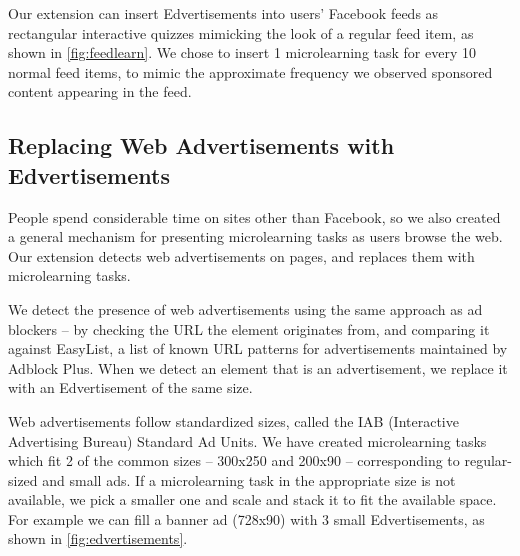 \documentclass{sigchi}
\begin{document}
Our extension can insert Edvertisements into users' Facebook feeds as rectangular interactive quizzes mimicking the look of a regular feed item, as shown in \autoref{fig:feedlearn}. We chose to insert 1 microlearning task for every 10 normal feed items, to mimic the approximate frequency we observed sponsored content appearing in the feed.

\subsection{Replacing Web Advertisements with Edvertisements}

People spend considerable time on sites other than Facebook, so we also created a general mechanism for presenting microlearning tasks as users browse the web. Our extension detects web advertisements on pages, and replaces them with microlearning tasks.


We detect the presence of web advertisements using the same approach as ad blockers -- by checking the URL the element originates from, and comparing it against EasyList, a list of known URL patterns for advertisements maintained by Adblock Plus. When we detect an element that is an advertisement, we replace it with an Edvertisement of the same size.

Web advertisements follow standardized sizes, called the IAB (Interactive Advertising Bureau) Standard Ad Units.
We have created microlearning tasks which fit 2 of the common sizes -- 300x250 and 200x90 -- corresponding to regular-sized and small ads.  If a microlearning task in the appropriate size is not available, we pick a smaller one and scale and stack it to fit the available space. For example we can fill a banner ad (728x90) with 3 small Edvertisements, as shown in \autoref{fig:edvertisements}. %
\end{document}
